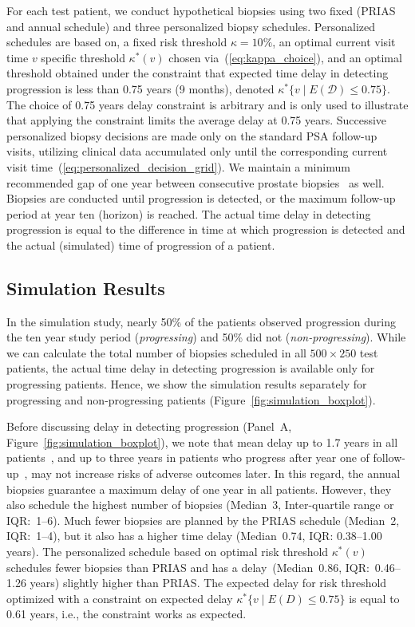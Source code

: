 For each test patient, we conduct hypothetical biopsies using two fixed (PRIAS and annual schedule) and three personalized biopsy schedules. Personalized schedules are based on, a fixed risk threshold $\kappa=10\%$, an optimal current visit time $v$ specific threshold $\kappa^*(v)$ chosen via~(\ref{eq:kappa_choice}), and an optimal threshold obtained under the constraint that expected time delay in detecting progression is less than 0.75 years (9 months), denoted $\kappa^*\{v \mid E(\mathcal{D})\leq 0.75\}$. The choice of 0.75 years delay constraint is arbitrary and is only used to illustrate that applying the constraint limits the average delay at 0.75 years. Successive personalized biopsy decisions are made only on the standard PSA follow-up visits, utilizing clinical data accumulated only until the corresponding current visit time~(\ref{eq:personalized_decision_grid}). We maintain a minimum recommended gap of one year between consecutive prostate biopsies~\citep{bokhorst2015compliance} as well. Biopsies are conducted until progression is detected, or the maximum follow-up period at year ten (horizon) is reached. The actual time delay in detecting progression is equal to the difference in time at which progression is detected and the actual (simulated) time of progression of a patient.

\subsection{Simulation Results}
In the simulation study, nearly 50\% of the patients observed progression during the ten year study period (\emph{progressing}) and 50\% did not (\emph{non-progressing}). While we can calculate the total number of biopsies scheduled in all $500 \times 250$ test patients, the actual time delay in detecting progression is available only for progressing patients. Hence, we show the simulation results separately for progressing and non-progressing patients (Figure~\ref{fig:simulation_boxplot}).

Before discussing delay in detecting progression (Panel~A, Figure~\ref{fig:simulation_boxplot}), we note that mean delay up to 1.7 years in all patients~\citep{inoue2018comparative}, and up to three years in patients who progress after year one of follow-up~\citep{carvalho}, may not increase risks of adverse outcomes later. In this regard, the annual biopsies guarantee a maximum delay of one year in all patients. However, they also schedule the highest number of biopsies (Median~3, Inter-quartile range or IQR:~1--6). Much fewer biopsies are planned by the PRIAS schedule (Median~2, IQR:~1--4), but it also has a higher time delay (Median~0.74, IQR: 0.38--1.00 years). The personalized schedule based on optimal risk threshold $\kappa^*(v)$ schedules fewer biopsies than PRIAS and has a delay~(Median~0.86, IQR:~0.46--1.26 years) slightly higher than PRIAS. The expected delay for risk threshold optimized with a constraint on expected delay $\kappa^*\{v \mid E(D)\leq 0.75\}$ is equal to 0.61 years, i.e., the constraint works as expected.

